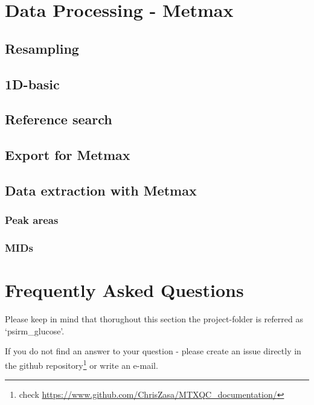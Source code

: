 \documentclass[]{book}
\let\rmarkdownfootnote\footnote%
\def\footnote{\protect\rmarkdownfootnote}
\theoremstyle{definition}
\theoremstyle{definition}
\theoremstyle{definition}
\theoremstyle{remark}
\begin{document}
\chapter{Data Processing - Metmax}\label{metmaxproc}

\section{Resampling}\label{resampling-1}

\section{1D-basic}\label{d-basic}

\section{Reference search}\label{reference-search}

\section{Export for Metmax}\label{export-for-metmax}

\section{Data extraction with Metmax}\label{data-extraction-with-metmax}

\subsection{Peak areas}\label{peak-areas}

\subsection{MIDs}\label{mids}

\chapter{Frequently Asked Questions}\label{FAQ}

Please keep in mind that thorughout this section the project-folder is
referred as `psirm\_glucose'.

If you do not find an answer to your question - please create an issue
directly in the github repository\footnote{check
  \url{https://www.github.com/ChrisZasa/MTXQC_documentation/}} or write
an e-mail.
\end{document}

